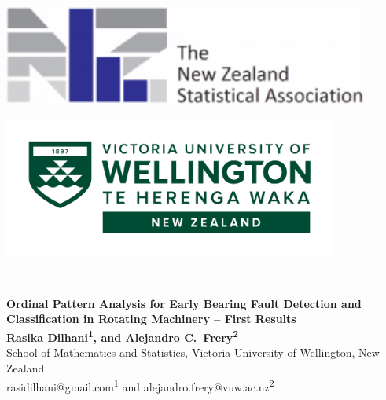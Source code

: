 \documentclass[a0,portrait]{a0poster}
\begin{document}
\begin{mdframed}[style=MyFrame]

\begin{minipage}[b]{0.33\linewidth}
\raggedright
\includegraphics[width=12cm,valign=t]{NZSA-logo-words-e1505785105112-1.png}
\end{minipage}
%
\begin{minipage}[b]{0.33\linewidth}
\centering
\hfill
\end{minipage}
% 
\begin{minipage}[b]{0.33\linewidth}
\raggedleft
\includegraphics[width=11cm,valign=t]{Logo Offshore Standard Landscape Reversed RGB.png}
\end{minipage}\\

\vspace{3cm}
\begin{minipage}[h]{0.98\linewidth}
\centering \huge \color{SteelBlue} \textbf{Ordinal Pattern Analysis for Early Bearing Fault Detection and Classification in Rotating Machinery -- First Results} \color{Black}\\ %
\Large \textbf{Rasika Dilhani\textsuperscript{1}, and Alejandro C.\ Frery\textsuperscript{2}}\\ %
\normalsize School of Mathematics and Statistics, Victoria University of Wellington, New Zealand \\ %
rasidilhani@gmail.com\textsuperscript{1} and alejandro.frery@vuw.ac.nz\textsuperscript{2}\\
\end{minipage}
\vspace{0.5cm} %


\end{mdframed}
\end{document}
